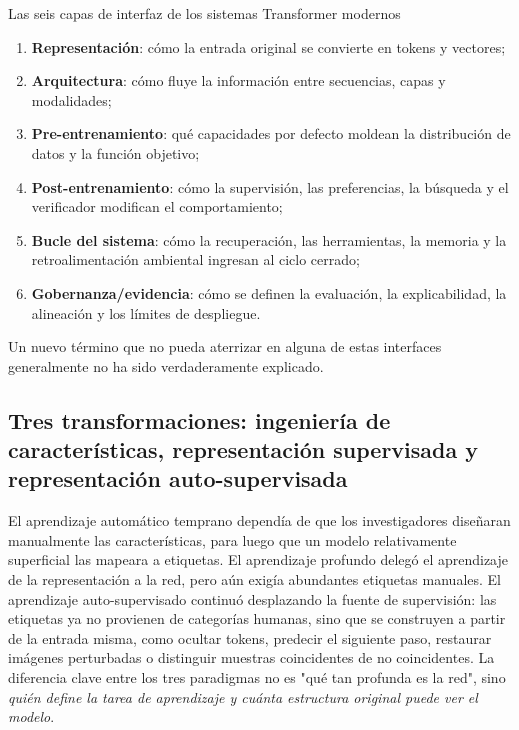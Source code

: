\documentclass[a4paper]{article}
\begin{document}
\begin{importantbox}{Las seis capas de interfaz de los sistemas Transformer modernos}
\begin{enumerate}
  \item \textbf{Representación}: cómo la entrada original se convierte en tokens y vectores;
  \item \textbf{Arquitectura}: cómo fluye la información entre secuencias, capas y modalidades;
  \item \textbf{Pre-entrenamiento}: qué capacidades por defecto moldean la distribución de datos y la función objetivo;
  \item \textbf{Post-entrenamiento}: cómo la supervisión, las preferencias, la búsqueda y el verificador modifican el comportamiento;
  \item \textbf{Bucle del sistema}: cómo la recuperación, las herramientas, la memoria y la retroalimentación ambiental ingresan al ciclo cerrado;
  \item \textbf{Gobernanza/evidencia}: cómo se definen la evaluación, la explicabilidad, la alineación y los límites de despliegue.
\end{enumerate}
Un nuevo término que no pueda aterrizar en alguna de estas interfaces generalmente no ha sido verdaderamente explicado.
\end{importantbox}

\subsection{Tres transformaciones: ingeniería de características, representación supervisada y representación auto-supervisada}

El aprendizaje automático temprano dependía de que los investigadores diseñaran manualmente las características, para luego que un modelo relativamente superficial las mapeara a etiquetas. El aprendizaje profundo delegó el aprendizaje de la representación a la red, pero aún exigía abundantes etiquetas manuales. El aprendizaje auto-supervisado continuó desplazando la fuente de supervisión: las etiquetas ya no provienen de categorías humanas, sino que se construyen a partir de la entrada misma, como ocultar tokens, predecir el siguiente paso, restaurar imágenes perturbadas o distinguir muestras coincidentes de no coincidentes. La diferencia clave entre los tres paradigmas no es "qué tan profunda es la red", sino \emph{quién define la tarea de aprendizaje y cuánta estructura original puede ver el modelo}.
\end{document}
